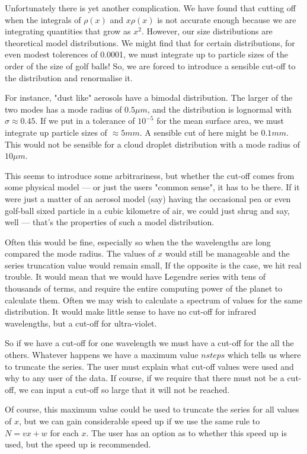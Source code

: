 \begin{flushleft}
Unfortunately there is yet another complication. We have found that cutting off
 when the integrals of $\rho(x)$ and $ x \rho(x)$ is not accurate enough
 because we are integrating quantities that grow as $x^2$. However, our
 size distributions are theoretical model distributions. We might find that for
certain distributions, for even modest tolerences of 0.0001, we must integrate
up to particle sizes of the order of the size of golf balls! So, we are forced
to introduce a sensible cut-off to the distribution and renormalise it.

For instance, "dust like" aerosols have a bimodal distribution. The
larger of the two modes has a mode radius of $0.5 \mu m$, and the distribution
is lognormal with $\sigma \approx 0.45$. If we put in a tolerance of
$10^{-5}$ for the mean surface area, we must integrate up  particle
sizes of $\approx 5mm$. A sensible cut of here might be $0.1mm$. This
would not be sensible for a cloud droplet distribution with a mode radius of $10\mu m$.

This seems to introduce some arbitrariness, but whether the cut-off comes
from some physical model --- or just the users "common sense", it has to be
there. If it were just a matter of an aerosol model (say) having the occasional
 pea or even golf-ball sixed particle in a cubic kilometre of air, we could
just shrug and say, well --- that's the properties of such a model distribution.

Often this would be fine, especially so when the the wavelengths are long
compared the mode radius. The values of $x$ would still be manageable
 and the series truncation value would remain small,
If the opposite is the case, we hit real trouble.
It would mean that we would have Legendre series with
tens of thousands of terms, and require the entire computing power of the planet to
calculate them. Often we may wish to calculate a spectrum of values for
the same distribution. It would make little sense to have no cut-off for
infrared wavelengths, but a cut-off for ultra-violet. 

So if we have a cut-off 
for one wavelength we must have a cut-off for the all the others.
Whatever happens we have a maximum value $nsteps$ which tells us 
where to truncate the series. The user must explain what cut-off values
were used and why to any user of the data. If course, if we require
that there must not be a cut-off, we can input a cut-off so large
that it will not be reached.

 Of course, this maximum value could be used to truncate the series
for all values of $x$, but we can gain considerable speed up if we use the same
rule to $N=v x+w$ for each $x$. The user has an option as to whether this speed up
is used, but the speed up is recommended.


\end{flushleft}
